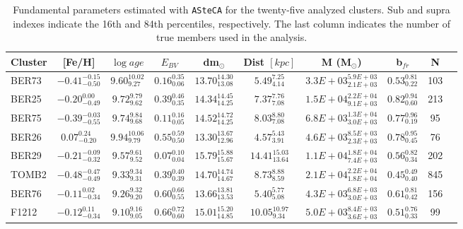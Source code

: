\documentclass[draft]{aa}
\begin{document}
  \begin{table}
  \caption{Fundamental parameters estimated with \texttt{ASteCA} for the
  twenty-five analyzed clusters. Sub and supra indexes
  indicate the 16th and 84th percentiles, respectively. The last column
  indicates the number of true members used in the analysis.}
  \label{tab:results}
  \centering
  \begin{tabular}{lccccccccc}
  \hline\hline
  Cluster  & [Fe/H] & $\log{age}$ & $E_{BV}$ & dm$_{\odot}$ & Dist $[kpc]$ & M (M$_{\odot}$) & b$_{fr}$ & N\\
  \hline %
    BER73 & $-0.41_{-0.50}^{-0.15}$ & $9.60_{9.27}^{10.02}$ &
    $0.16_{0.06}^{0.35}$ & $13.70_{13.08}^{14.30}$ & $5.49_{4.14}^{7.25}$ &
    $3.3E+03_{2.1E+03}^{5.9E+03}$ & $0.53_{0.22}^{0.81}$ & 103 \\[.2cm]
    BER25 & $-0.20_{-0.49}^{0.00}$ & $9.72_{9.62}^{9.79}$ &
    $0.39_{0.35}^{0.46}$ & $14.34_{14.25}^{14.45}$ & $7.37_{7.08}^{7.76}$ &
    $1.5E+04_{9.1E+03}^{2.2E+04}$ & $0.82_{0.60}^{0.94}$ & 213 \\[.2cm]
    BER75 & $-0.39_{-0.55}^{-0.03}$ & $9.74_{9.68}^{9.84}$ &
    $0.11_{0.05}^{0.16}$ & $14.52_{14.25}^{14.72}$ & $8.03_{7.08}^{8.80}$ &
    $6.8E+03_{3.0E+03}^{1.3E+04}$ & $0.77_{0.19}^{0.96}$ & 95 \\[.2cm]
    BER26 & $0.07_{-0.20}^{0.24}$ & $9.94_{9.79}^{10.06}$ &
    $0.55_{0.50}^{0.59}$ & $13.30_{12.96}^{13.67}$ & $4.57_{3.91}^{5.43}$ &
    $4.6E+03_{2.3E+03}^{8.5E+03}$ & $0.78_{0.45}^{0.95}$ & 76 \\[.2cm]
    BER29 & $-0.21_{-0.32}^{-0.09}$ & $9.57_{9.52}^{9.61}$ &
    $0.07_{0.04}^{0.10}$ & $15.79_{15.67}^{15.88}$ & $14.41_{13.64}^{15.03}$ &
    $1.1E+04_{7.4E+03}^{1.8E+04}$ & $0.56_{0.34}^{0.82}$ & 202 \\[.2cm]
    TOMB2 & $-0.48_{-0.49}^{-0.47}$ & $9.33_{9.31}^{9.34}$ &
    $0.39_{0.39}^{0.40}$ & $14.70_{14.67}^{14.74}$ & $8.73_{8.59}^{8.88}$ &
    $2.1E+04_{1.8E+04}^{2.2E+04}$ & $0.45_{0.40}^{0.49}$ & 845 \\[.2cm]
    BER76 & $-0.11_{-0.34}^{0.02}$ & $9.26_{9.20}^{9.32}$ &
    $0.60_{0.55}^{0.66}$ & $13.66_{13.53}^{13.81}$ & $5.40_{5.08}^{5.77}$ &
    $4.3E+03_{3.0E+03}^{6.8E+03}$ & $0.61_{0.42}^{0.81}$ & 156 \\[.2cm]
    F1212 & $-0.12_{-0.34}^{0.11}$ & $9.10_{9.05}^{9.16}$ &
    $0.66_{0.60}^{0.72}$ & $15.01_{14.85}^{15.20}$ & $10.05_{9.34}^{10.97}$ &
    $5.0E+03_{3.6E+03}^{8.4E+03}$ & $0.51_{0.33}^{0.76}$ & 99 \\[.2cm]

\end{tabular}
\end{table}
\end{document}
